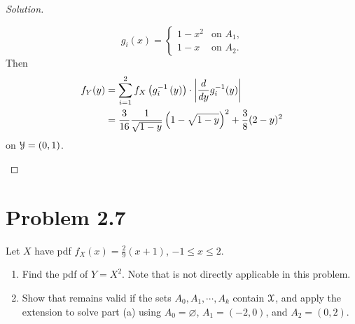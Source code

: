 \documentclass[12pt,letterpaper,reqno]{amsart}
\numberwithin{equation}{subsection}
\let\emptyset\varnothing
\begin{document}
\begin{proof}[Solution]
\begin{enumerate}[label=(\alph*),leftmargin=*]
    \[ g_i(x) = \left\{ \begin{array}{cl}
        1-x^2 & \mbox{on $A_1$,} \\
        1-x & \mbox{on $A_2$.}
    \end{array} \right. \]
    Then 
    \begin{align*}
        {f_Y}\! \left( {y} \right) &= \sum_{i=1}^2 f_X \left( g_i^{-1} \left( y \right) \right) \cdot \left\lvert{\frac{d{}}{d{y}} g_i^{-1}(y)}\right\rvert \\
        &= \frac{3}{16} \frac{1}{\sqrt{1-y}} \left( 1 - \sqrt{1-y} \right)^2 +\frac{3}{8} (2-y)^2
    \end{align*}
    on $\mathcal{{Y}} = (0, 1)$.
\end{enumerate}
\end{proof}

\newpage
\section{Problem 2.7}

Let $X$ have pdf $f_X(x) = \frac{2}{9}(x+1)$, $-1 \leq x \leq 2$.

\begin{enumerate}[label=(\alph*),leftmargin=*]
    \item Find the pdf of $Y = X^2$. Note that \cite[Theorem 2.1.8 on page 53]{Berger-Casella} is not directly applicable in this problem.
    \item Show that \cite[Theorem 2.1.8 on page 53]{Berger-Casella} remains valid if the sets $A_0, A_1, \cdots, A_k$ contain $\mathcal{{X}}$, and apply the extension to solve part (a) using $A_0 = \emptyset$, $A_1 = (-2,0)$, and $A_2 = (0,2)$.
\end{enumerate}~\\
\end{document}
